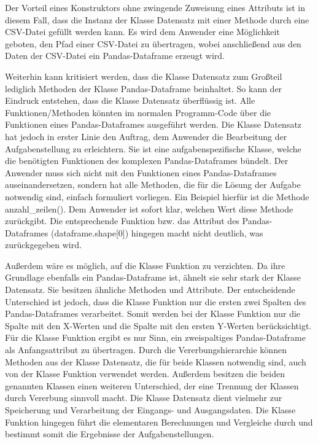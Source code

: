 \documentclass[
    a4paper, 								%
    oneside, 								%
    11pt, 									%
    listof=totoc, 					%
    bibliography=totoc, 		%
    final, 									%
    numbers=noenddot
]{scrreprt}
\begin{document}
Der Vorteil eines Konstruktors ohne zwingende Zuweisung eines Attributs ist in diesem Fall, dass die Instanz der Klasse Datensatz mit einer Methode durch eine CSV-Datei gefüllt werden kann. Es wird dem Anwender eine Möglichkeit geboten, den Pfad einer CSV-Datei zu übertragen, wobei anschließend aus den Daten der CSV-Datei ein Pandas-Dataframe erzeugt wird.

Weiterhin kann kritisiert werden, dass die Klasse Datensatz zum Großteil lediglich Methoden der Klasse Pandas-Dataframe beinhaltet. So kann der Eindruck entstehen, dass die Klasse Datensatz überflüssig ist. Alle Funktionen/Methoden könnten im normalen Programm-Code über die Funktionen eines Pandas-Dataframes ausgeführt werden. Die Klasse Datensatz hat jedoch in erster Linie den Auftrag, dem Anwender die Bearbeitung der Aufgabenstellung zu erleichtern. Sie ist eine aufgabenspezifische Klasse, welche die benötigten Funktionen des komplexen Pandas-Dataframes bündelt. Der Anwender muss sich nicht mit den Funktionen eines Pandas-Dataframes auseinandersetzen, sondern hat alle Methoden, die für die Lösung der Aufgabe notwendig sind, einfach formuliert vorliegen. Ein Beispiel hierfür ist die Methode anzahl\_zeilen(). Dem Anwender ist sofort klar, welchen Wert diese Methode zurückgibt. Die entsprechende Funktion bzw. das Attribut des Pandas-Dataframes (dataframe.shape[0]) hingegen macht nicht deutlich, was zurückgegeben wird. 

Außerdem wäre es möglich, auf die Klasse Funktion zu verzichten. Da ihre Grundlage ebenfalls ein Pandas-Dataframe ist, ähnelt sie sehr stark der Klasse Datensatz. Sie besitzen ähnliche Methoden und Attribute. Der entscheidende Unterschied ist jedoch, dass die Klasse Funktion nur die ersten zwei Spalten des Pandas-Dataframes verarbeitet. Somit werden bei der Klasse Funktion nur die Spalte mit den X-Werten und die Spalte mit den ersten Y-Werten berücksichtigt. Für die Klasse Funktion ergibt es nur Sinn, ein zweispaltiges Pandas-Dataframe als Anfangsattribut zu übertragen. Durch die Vererbungshierarchie können Methoden aus der Klasse Datensatz, die für beide Klassen notwendig sind, auch von der Klasse Funktion verwendet werden. Außerdem besitzen die beiden genannten Klassen einen weiteren Unterschied, der eine Trennung der Klassen durch Vererbung sinnvoll macht. Die Klasse Datensatz dient vielmehr zur Speicherung und Verarbeitung der Eingangs- und Ausgangsdaten. Die Klasse Funktion hingegen führt die elementaren Berechnungen und Vergleiche durch und bestimmt somit die Ergebnisse der Aufgabenstellungen. 
\end{document}
